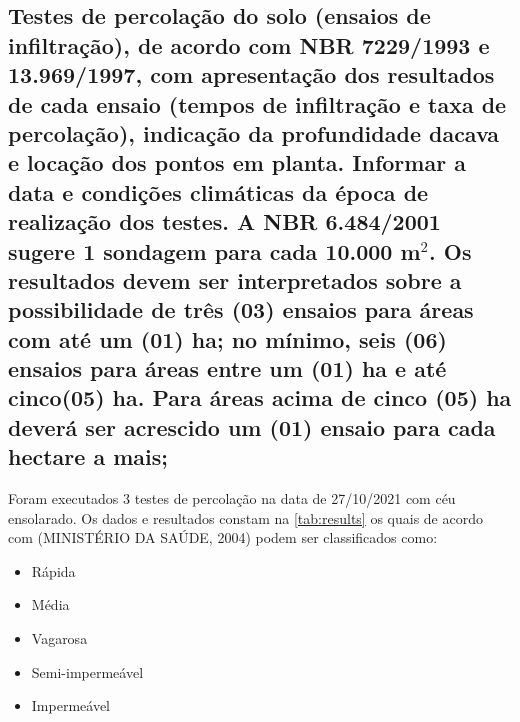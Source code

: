 \subsection{Testes de percolação do solo (ensaios de infiltração), de acordo com NBR 7229/1993 e 13.969/1997, com apresentação dos resultados de cada ensaio (tempos de infiltração e taxa de percolação), indicação da profundidade dacava e locação dos pontos em planta. Informar a data e condições climáticas da época de realização dos testes. A NBR 6.484/2001 sugere 1 sondagem para cada 10.000 m$^2$. Os resultados devem ser interpretados sobre a possibilidade de três (03) ensaios para áreas com até um (01) ha; no mínimo, seis (06) ensaios para áreas entre um (01) ha e até cinco(05) ha. Para áreas acima de cinco (05) ha deverá ser acrescido um (01) ensaio para cada hectare a mais;}

Foram executados 3 testes de percolação na data de 27/10/2021 com céu 
ensolarado. Os dados e resultados constam na 
\cref{tab:results} os quais de acordo com (MINISTÉRIO DA SAÚDE, 2004) 
podem ser classificados
como: 

\begin{itemize}
	\item Rápida
	\item Média
	\item Vagarosa
	\item Semi-impermeável
	\item Impermeável
\end{itemize}

\renewcommand{\multirowsetup}{\centering}

